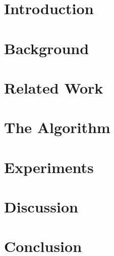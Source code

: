 \documentclass[12pt]{scrbook}
\begin{document}
\chapter{Introduction}
\label{introduction}

%
\chapter{Background}
\label{background}


\chapter{Related Work}
\label{related}

%
\chapter{The Algorithm}
\label{algorithm}

%
\chapter{Experiments}
\label{experiments}

%
\chapter{Discussion}
\label{discussion}

%
\chapter{Conclusion}

%
\printbibliography
%
%
\end{document}
